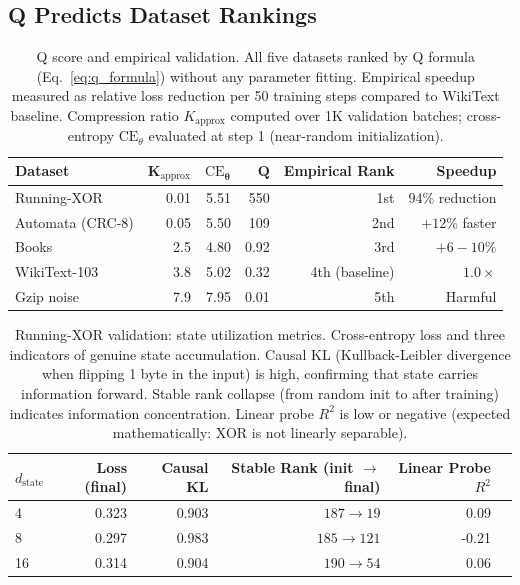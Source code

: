 \documentclass{article}
\begin{document}
\subsection{Q Predicts Dataset Rankings}

\begin{table}[t]
\centering
\small
\caption{Q score and empirical validation. All five datasets ranked by Q formula (Eq.~\ref{eq:q_formula}) without any parameter fitting. Empirical speedup measured as relative loss reduction per 50 training steps compared to WikiText baseline. Compression ratio $K_{\mathrm{approx}}$ computed over 1K validation batches; cross-entropy $\mathrm{CE}_\theta$ evaluated at step 1 (near-random initialization).}
\label{tab:q_ranking}
\begin{tabular}{lrrrrr}
\toprule
\textbf{Dataset} & $\mathbf{K_{\mathrm{approx}}}$ & $\mathbf{\mathrm{CE}_\theta}$ & $\mathbf{Q}$ & Empirical Rank & Speedup \\
\midrule
Running-XOR & 0.01 & 5.51 & 550 & 1st & $94\%$ reduction \\
Automata (CRC-8) & 0.05 & 5.50 & 109 & 2nd & $+12\%$ faster \\
Books & 2.5 & 4.80 & 0.92 & 3rd & $+6-10\%$ \\
WikiText-103 & 3.8 & 5.02 & 0.32 & 4th (baseline) & $1.0\times$ \\
Gzip noise & 7.9 & 7.95 & 0.01 & 5th & Harmful \\
\bottomrule
\end{tabular}
\end{table}

\begin{table}[t]
\centering
\small
\caption{Running-XOR validation: state utilization metrics. Cross-entropy loss and three indicators of genuine state accumulation. Causal KL (Kullback-Leibler divergence when flipping 1 byte in the input) is high, confirming that state carries information forward. Stable rank collapse (from random init to after training) indicates information concentration. Linear probe $R^2$ is low or negative (expected mathematically: XOR is not linearly separable).}
\label{tab:runningxor_metrics}
\begin{tabular}{lrrrrr}
\toprule
\textbf{$d_{\mathrm{state}}$} & \textbf{Loss (final)} & \textbf{Causal KL} & \textbf{Stable Rank (init $\to$ final)} & \textbf{Linear Probe $R^2$} \\
\midrule
4 & 0.323 & 0.903 & $187 \to 19$ & 0.09 \\
8 & 0.297 & 0.983 & $185 \to 121$ & -0.21 \\
16 & 0.314 & 0.904 & $190 \to 54$ & 0.06 \\
\bottomrule
\end{tabular}
\end{table}
\end{document}
